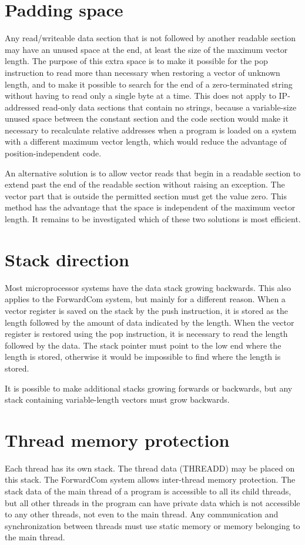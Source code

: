 \documentclass[forwardcom.tex]{subfiles}
\begin{document}
\section{Padding space} \label{PaddingSpace}
Any read/writeable data section that is not followed by another readable section may have an unused space at the end, at least the size of the maximum vector length. The purpose of this extra space is to make it possible for the pop instruction to read more than necessary when restoring a vector of unknown length, and to make 
it possible to search for the end of a zero-terminated string without having to read only a single byte at a time. This does not apply to IP-addressed read-only data sections that contain no strings, because a variable-size unused space between the constant section and the code section would make it necessary to recalculate relative addresses when a program is loaded on a system with a different maximum vector length, which would reduce the advantage of position-independent code.
\vv

An alternative solution is to allow vector reads that begin in a readable section to extend past the end of the readable section without raising an exception. The vector part that is outside the permitted section must get the value zero. This method has the advantage that the space is independent of the maximum vector length. It remains to be investigated which of these two solutions is most efficient.
\vv

\section{Stack direction} \label{StackDirection}
Most microprocessor systems have the data stack growing backwards. This also applies to the ForwardCom system, but mainly for a different reason. When a vector register is saved on the stack by the push instruction, it is stored as the length followed by the amount of data indicated by the length. When the vector register is restored using the pop instruction, it is necessary to read the length followed by the data. The stack pointer must point to the low end where the length is stored, otherwise it would be impossible to find where the length is stored. 
\vv

It is possible to make additional stacks growing forwards or backwards, but any stack containing variable-length vectors must grow backwards.
\vv

\section{Thread memory protection} \label{threadMemoryProtection}
Each thread has its own stack. The thread data (THREADD) may be placed on this stack. The ForwardCom system allows inter-thread memory protection. The stack data of the main thread of a program is accessible to all its child threads, but all other threads in the program can have private data which is not accessible to any other threads, not even to the main thread. Any communication and synchronization between threads must use static memory or memory belonging to the main thread. 
\vv
\end{document}

